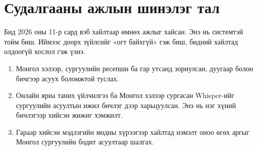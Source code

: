 \section{Судалгааны ажлын шинэлэг тал}
\label{sec:lit-novelty}

Бид 2026 оны 11-р сард вэб хайлтаар өмнөх ажлыг хайсан. Энэ нь системтэй тойм биш. Иймээс доорх зүйлсийг «огт байхгүй» гэж биш, бидний хайлтад олдоогүй хослол гэж үзнэ.
\begin{enumerate}
    \item Монгол хэлээр, сургуулийн ресепшн ба гар утсанд зориулсан, дуугаар болон бичгээр асуух боломжтой туслах.
    \item Онлайн яриа таних үйлчилгээ ба Монгол хэлээр сургасан Whisper-ийг сургуулийн асуултын ижил бичлэг дээр харьцуулсан. Энэ нь нэг хүний бичлэгээр хийсэн жижиг хэмжилт.
    \item Гараар хийсэн мэдлэгийн модны хүрээгээр хайлтад нэмэлт оноо өгөх аргыг Монгол сургуулийн бодит асуултаар шалгах.
\end{enumerate}
\fi

